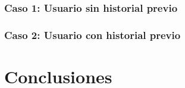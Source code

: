 \subsection{Caso 1: Usuario sin historial previo}

\subsection{Caso 2: Usuario con historial previo}

\chapter{Conclusiones} 